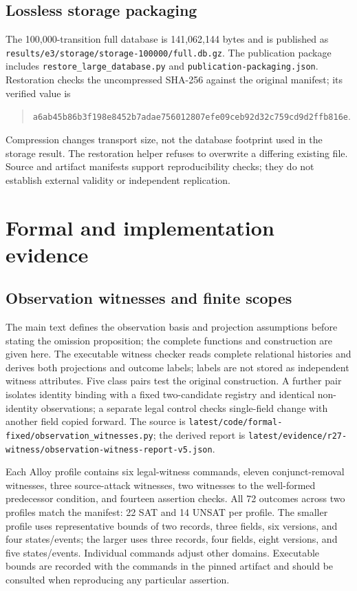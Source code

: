 \documentclass[preprint,12pt,authoryear]{elsarticle}
\newcommand{\code}[1]{\nolinkurl{#1}}
\begin{document}
\subsection{Lossless storage packaging}

The 100,000-transition full database is 141,062,144 bytes and is published as \code{results/e3/storage/storage-100000/full.db.gz}. The publication package includes \code{restore_large_database.py} and \code{publication-packaging.json}. Restoration checks the uncompressed SHA-256 against the original manifest; its verified value is
\begin{quote}\small
\code{a6ab45b86b3f198e8452b7adae756012807efe09ceb92d32c759cd9d2ffb816e}.
\end{quote}
Compression changes transport size, not the database footprint used in the storage result. The restoration helper refuses to overwrite a differing existing file. Source and artifact manifests support reproducibility checks; they do not establish external validity or independent replication.

\section{Formal and implementation evidence}
\label{app:formal-details}



\subsection{Observation witnesses and finite scopes}

The main text defines the observation basis and projection assumptions before stating the omission proposition; the complete functions and construction are given here. The executable witness checker reads complete relational histories and derives both projections and outcome labels; labels are not stored as independent witness attributes. Five class pairs test the original construction. A further pair isolates identity binding with a fixed two-candidate registry and identical non-identity observations; a separate legal control checks single-field change with another field copied forward. The source is \code{latest/code/formal-fixed/observation_witnesses.py}; the derived report is \code{latest/evidence/r27-witness/observation-witness-report-v5.json}.

Each Alloy profile contains six legal-witness commands, eleven conjunct-removal witnesses, three source-attack witnesses, two witnesses to the well-formed predecessor condition, and fourteen assertion checks. All 72 outcomes across two profiles match the manifest: 22 SAT and 14 UNSAT per profile. The smaller profile uses representative bounds of two records, three fields, six versions, and four states/events; the larger uses three records, four fields, eight versions, and five states/events. Individual commands adjust other domains. Executable bounds are recorded with the commands in the pinned artifact and should be consulted when reproducing any particular assertion.
\end{document}
